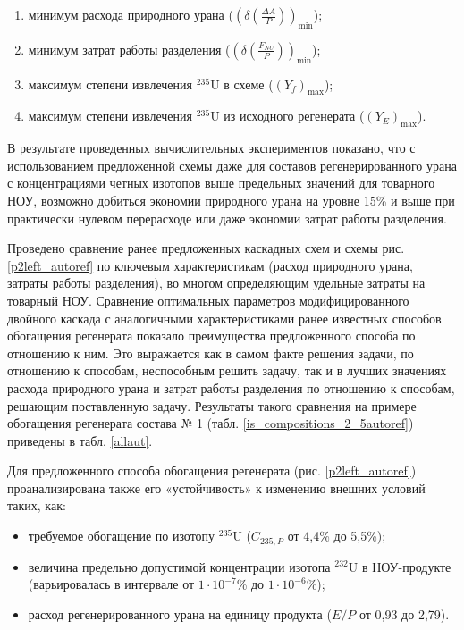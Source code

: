 \begin{enumerate}
  \item минимум расхода природного урана ($(\delta(\frac{\Delta A}{P}))_\text{min}$);
  \item минимум затрат работы разделения ($(\delta(\frac{F_{NU}}{P}))_\text{min}$);
  \item максимум степени извлечения $^{235}$U в схеме ($(Y_f)_\text{max}$);
  \item максимум степени извлечения $^{235}$U из исходного регенерата ($(Y_{E})_\text{max}$).
\end{enumerate}  

В результате проведенных вычислительных экспериментов показано, что с использованием предложенной схемы даже для составов регенерированного урана с концентрациями четных изотопов выше предельных значений для товарного НОУ, возможно добиться экономии природного урана на уровне 15\% и выше при практически нулевом перерасходе или даже экономии затрат работы разделения. 

Проведено сравнение ранее предложенных каскадных схем и схемы рис. \ref{p2left_autoref} по ключевым характеристикам (расход природного урана, затраты работы разделения), во многом определяющим удельные затраты на товарный НОУ. Сравнение оптимальных параметров модифицированного двойного каскада с аналогичными характеристиками ранее известных способов обогащения регенерата показало преимущества предложенного способа по отношению к ним. Это выражается как в самом факте решения задачи, по отношению к способам, неспособным решить задачу, так и в лучших значениях расхода природного урана и затрат работы разделения по отношению к способам, решающим поставленную задачу. Результаты такого сравнения на примере обогащения регенерата состава № 1 (табл. \ref{is_compositions_2_5autoref}) приведены в табл. \ref{allaut}. 

Для предложенного способа обогащения регенерата (рис. \ref{p2left_autoref}) проанализирована также его «устойчивость» к изменению внешних условий таких, как:
\begin{itemize}
  \item требуемое обогащение по изотопу $^{235}$U ($C_{235,P}$ от  4,4\% до  5,5\%);    
  \item величина предельно допустимой концентрации изотопа $^{232}$U в НОУ-продукте (варьировалась в интервале от $1\cdot10^{-7}$\% до $1\cdot10^{-6}$\%);
  \item расход регенерированного урана на единицу продукта ($E/P$ от 0,93 до 2,79).
\end{itemize}

